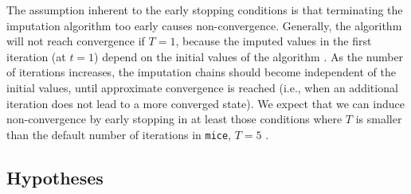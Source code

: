 \documentclass[Royal,times,sageh]{sagej}
\begin{document}
The assumption inherent to the early stopping conditions is that terminating the imputation algorithm too early causes non-convergence. Generally, the algorithm will not reach convergence if \(T=1\), because the imputed values in the first iteration (at \(t=1\)) depend on the initial values of the algorithm \citep[which are sampled randomly from the set of observed datapoints;][]{buur18}. As the number of iterations increases, the imputation chains should become independent of the initial values, until approximate convergence is reached (i.e., when an additional iteration does not lead to a more converged state). We expect that we can induce non-convergence by early stopping in at least those conditions where \(T\) is smaller than the default number of iterations in \texttt{mice}, \(T=5\) \citep{mice}.

\hypertarget{hypotheses}{%
\subsection{Hypotheses}\label{hypotheses}}
\end{document}
